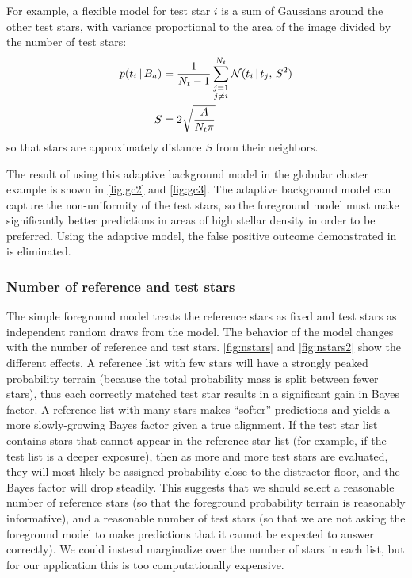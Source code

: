 For example, a flexible model for test star $i$ is a sum of Gaussians
around the other test stars, with variance proportional to the area of
the image divided by the number of test stars:
\begin{align}
  p(t_i \,\vert\, B_a) &= \frac{1}{{N_t}-1} \sum_{\substack{j=1 \\ j \ne i}}^{{N_t}}
  \mathcal{N}(t_i \, | \, t_j,\, S^2)
  \label{eq:pb2} \\
  S &= 2 \sqrt{\frac{A}{{N_t} \pi}}
  \label{eq:S}
\end{align}
so that stars are approximately distance $S$ from their neighbors.


The result of using this adaptive background model in the globular
cluster example is shown in \figs \ref{fig:gc2} and \ref{fig:gc3}.
The adaptive background model can capture the non-uniformity of the
test stars, so the foreground model must make significantly better
predictions in areas of high stellar density in order to be preferred.
Using the adaptive model, the false positive outcome demonstrated in
 is eliminated.


\subsubsection{Number of reference and test stars}


The simple foreground model treats the reference stars as fixed and
test stars as independent random draws from the model.  The behavior
of the model changes with the number of reference and test stars.
\Figs \ref{fig:nstars} and \ref{fig:nstars2} show the different
effects.  A reference list with few stars will have a strongly peaked
probability terrain (because the total probability mass is split
between fewer stars), thus each correctly matched test star results in
a significant gain in Bayes factor.  A reference list with many stars
makes ``softer'' predictions and yields a more slowly-growing Bayes
factor given a true alignment.  If the test star list contains stars
that cannot appear in the reference star list (for example, if the
test list is a deeper exposure), then as more and more test stars are
evaluated, they will most likely be assigned probability close to the
distractor floor, and the Bayes factor will drop steadily.  This
suggests that we should select a reasonable number of reference stars
(so that the foreground probability terrain is reasonably
informative), and a reasonable number of test stars (so that we are
not asking the foreground model to make predictions that it cannot be
expected to answer correctly).  We could instead marginalize over the
number of stars in each list, but for our application this is too
computationally expensive.


